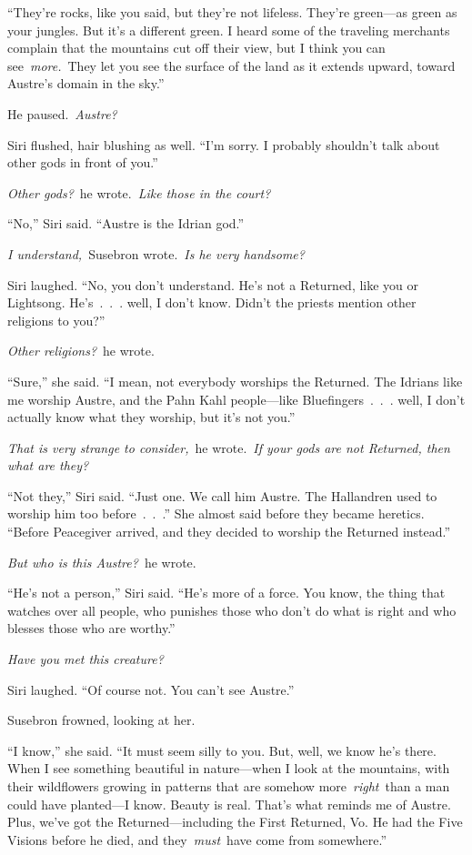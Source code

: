 “They’re rocks, like you said, but they’re not lifeless. They’re green—as green as your jungles. But it’s a different green. I heard some of the traveling merchants complain that the mountains cut off their view, but I think you can see~\textit{more.}~They let you see the surface of the land as it extends upward, toward Austre’s domain in the sky.”

He paused.~\textit{Austre?}

Siri flushed, hair blushing as well. “I’m sorry. I probably shouldn’t talk about other gods in front of you.”

\textit{Other gods?}~he wrote.~\textit{Like those in the court?}

“No,” Siri said. “Austre is the Idrian god.”

\textit{I understand,}~Susebron wrote.~\textit{Is he very handsome?}

Siri laughed. “No, you don’t understand. He’s not a Returned, like you or Lightsong. He’s~.~.~. well, I don’t know. Didn’t the priests mention other religions to you?”

\textit{Other religions?}~he wrote.

“Sure,” she said. “I mean, not everybody worships the Returned. The Idrians like me worship Austre, and the Pahn Kahl people—like Bluefingers~.~.~. well, I don’t actually know what they worship, but it’s not you.”

\textit{That is very strange to consider,}~he wrote.~\textit{If your gods are not Returned, then what are they?}

“Not they,” Siri said. “Just one. We call him Austre. The Hallandren used to worship him too before~.~.~.” She almost said before they became heretics. “Before Peacegiver arrived, and they decided to worship the Returned instead.”

\textit{But who is this Austre?}~he wrote.

“He’s not a person,” Siri said. “He’s more of a force. You know, the thing that watches over all people, who punishes those who don’t do what is right and who blesses those who are worthy.”

\textit{Have you met this creature?}

Siri laughed. “Of course not. You can’t see Austre.”

Susebron frowned, looking at her.

“I know,” she said. “It must seem silly to you. But, well, we know he’s there. When I see something beautiful in nature—when I look at the mountains, with their wildflowers growing in patterns that are somehow more~\textit{right}~than a man could have planted—I know. Beauty is real. That’s what reminds me of Austre. Plus, we’ve got the Returned—including the First Returned, Vo. He had the Five Visions before he died, and they~\textit{must}~have come from somewhere.”

